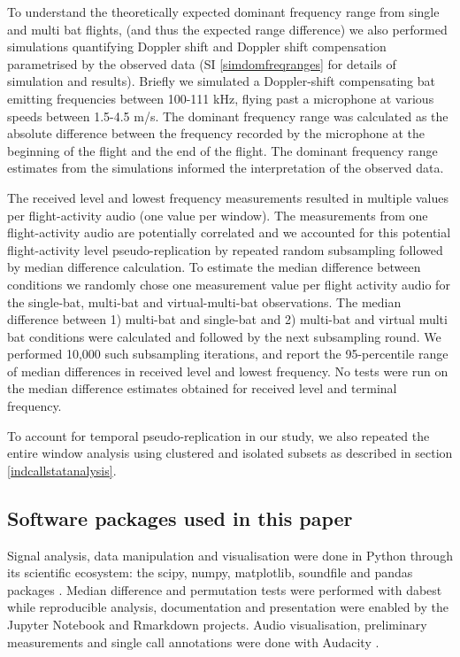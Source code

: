 \documentclass[
]{book}
\begin{document}
To understand the theoretically expected dominant frequency range from single and multi bat flights, (and thus the expected range difference) we also performed simulations quantifying Doppler shift and Doppler shift compensation parametrised by the observed data (SI \ref{simdomfreqranges} for details of simulation and results). Briefly we simulated a Doppler-shift compensating bat emitting frequencies between 100-111 kHz, flying past a microphone at various speeds between 1.5-4.5 m/s. The dominant frequency range was calculated as the absolute difference between the frequency recorded by the microphone at the beginning of the flight and the end of the flight. The dominant frequency range estimates from the simulations informed the interpretation of the observed data.

The received level and lowest frequency measurements resulted in multiple values per flight-activity audio (one value per window). The measurements from one flight-activity audio are potentially correlated and we accounted for this potential flight-activity level pseudo-replication by repeated random subsampling followed by median difference calculation. To estimate the median difference between conditions we randomly chose one measurement value per flight activity audio for the single-bat, multi-bat and virtual-multi-bat observations. The median difference between 1) multi-bat and single-bat and 2) multi-bat and virtual multi bat conditions were calculated and followed by the next subsampling round. We performed 10,000 such subsampling iterations, and report the 95-percentile range of median differences in received level and lowest frequency. No tests were run on the median difference estimates obtained for received level and terminal frequency.

To account for temporal pseudo-replication in our study, we also repeated the entire window analysis using clustered and isolated subsets as described in section \ref{indcallstatanalysis}.

\hypertarget{software-packages-used-in-this-paper}{%
\subsection{Software packages used in this paper}\label{software-packages-used-in-this-paper}}

Signal analysis, data manipulation and visualisation were done in Python \citep{van1995python} through its scientific ecosystem: the scipy, numpy, matplotlib, soundfile and pandas packages \citep{2020SciPy, oliphant2006a, hunter2007a, soundfile, mckinney2010a}. Median difference and permutation tests were performed with dabest \citep{ho2019moving} while reproducible analysis, documentation and presentation were enabled by the Jupyter Notebook and Rmarkdown projects\citep{jupyter, rmarkdown}. Audio visualisation, preliminary measurements and single call annotations were done with Audacity \citep{audacity}.
\end{document}
